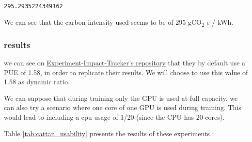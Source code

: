 \documentclass[11pt]{article}
\begin{document}
\begin{verbatim}
295.2935224349162
\end{verbatim}


We can see that the carbon intensity used seems to be of 295 gCO\textsubscript{2} e /
kWh.

\subsubsection{results}
\label{sec:org4285cc7}

we can see on \href{https://github.com/Breakend/experiment-impact-tracker}{Experiment-Impact-Tracker's repository} that they by default use a PUE
of 1.58, in order to replicate their results. We will choose to use
this value of 1.58 as dynamic ratio.

We can suppose that during training only the GPU is used at full
capacity. we can also try a scenario where one core of one GPU is used
during training. This would lead to including a cpu usage of 1/20
(since the CPU has 20 cores).

Table \ref{tab:cattan_usability} presents the results of these
experiments :
\end{document}
